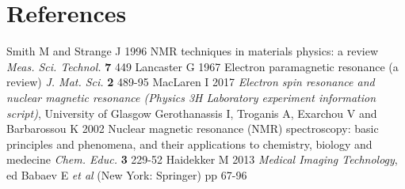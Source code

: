 \documentclass[a4paper]{jpconf}
\numberwithin{equation}{section}
\begin{document}
\section*{References}
\begin{thebibliography}{9}
 Smith M and Strange J 1996 NMR techniques in materials physics: a review \textit{Meas. Sci. Technol.} \textbf{7} 449
 Lancaster G 1967 Electron paramagnetic resonance (a review) \textit{J. Mat. Sci.} \textbf{2} 489-95
 MacLaren I 2017 \textit{Electron spin resonance and nuclear magnetic resonance (Physics 3H Laboratory experiment information script)}, University of Glasgow
 Gerothanassis I, Troganis A, Exarchou V and Barbarossou K 2002 Nuclear magnetic resonance (NMR) spectroscopy:
basic principles and phenomena, and their applications to chemistry, biology and medecine \textit{Chem. Educ.} \textbf{3} 229-52
 Haidekker M 2013 \textit{Medical Imaging Technology}, ed Babaev E \textit{et al} (New York: Springer) pp 67-96
\end{thebibliography}
\end{document}
